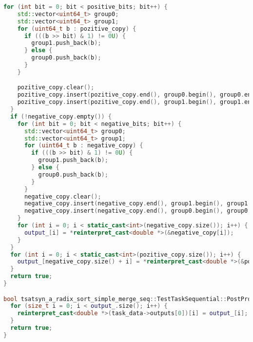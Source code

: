\documentclass[a4paper,12pt]{article}
\begin{document}
\begin{lstlisting}[language=C++,
    breaklines=true,       % Автоматический перенос строк
    columns=fullflexible ]
  for (int bit = 0; bit < positive_bits; bit++) {
    std::vector<uint64_t> group0;
    std::vector<uint64_t> group1;
    for (uint64_t b : pozitive_copy) {
      if (((b >> bit) & 1) != 0U) {
        group1.push_back(b);
      } else {
        group0.push_back(b);
      }
    }

    pozitive_copy.clear();
    pozitive_copy.insert(pozitive_copy.end(), group0.begin(), group0.end());
    pozitive_copy.insert(pozitive_copy.end(), group1.begin(), group1.end());
  }
  if (!negative_copy.empty()) {
    for (int bit = 0; bit < negative_bits; bit++) {
      std::vector<uint64_t> group0;
      std::vector<uint64_t> group1;
      for (uint64_t b : negative_copy) {
        if (((b >> bit) & 1) != 0U) {
          group1.push_back(b);
        } else {
          group0.push_back(b);
        }
      }
      negative_copy.clear();
      negative_copy.insert(negative_copy.end(), group1.begin(), group1.end());
      negative_copy.insert(negative_copy.end(), group0.begin(), group0.end());
    }
    for (int i = 0; i < static_cast<int>(negative_copy.size()); i++) {
      output_[i] = *reinterpret_cast<double *>(&negative_copy[i]);
    }
  }
  for (int i = 0; i < static_cast<int>(pozitive_copy.size()); i++) {
    output_[negative_copy.size() + i] = *reinterpret_cast<double *>(&pozitive_copy[i]);
  }
  return true;
}

bool tsatsyn_a_radix_sort_simple_merge_seq::TestTaskSequential::PostProcessingImpl() {
  for (size_t i = 0; i < output_.size(); i++) {
    reinterpret_cast<double *>(task_data->outputs[0])[i] = output_[i];
  }
  return true;
}
\end{lstlisting}
\end{document}
